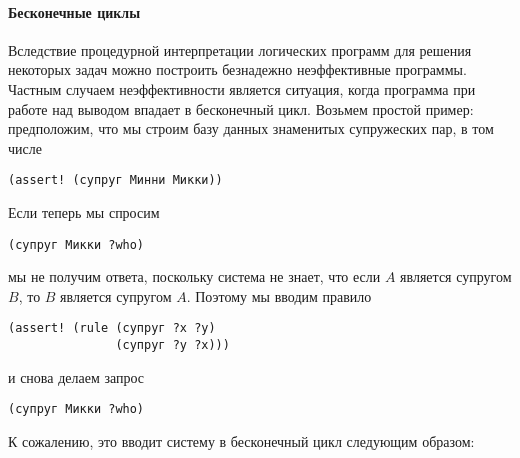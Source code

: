 \paragraph{Бесконечные циклы}

Вследствие 
процедурной интерпретации логических
программ для решения некоторых задач можно построить безнадежно
неэффективные программы.  Частным случаем неэффективности является
ситуация, когда программа при работе над выводом впадает в
бесконечный цикл. Возьмем простой пример: предположим, что мы
строим базу данных знаменитых супружеских пар, в том числе

\begin{Verbatim}[fontsize=\small]
(assert! (супруг Минни Микки))
\end{Verbatim}
Если 
теперь мы спросим

\begin{Verbatim}[fontsize=\small]
(супруг Микки ?who)
\end{Verbatim}
мы не получим ответа, поскольку система не знает, что если
$A$ является супругом $B$, то $B$ является
супругом $A$. Поэтому мы вводим правило

\begin{Verbatim}[fontsize=\small]
(assert! (rule (супруг ?x ?y)
               (супруг ?y ?x)))
\end{Verbatim}
и снова делаем запрос

\begin{Verbatim}[fontsize=\small]
(супруг Микки ?who)
\end{Verbatim}
К сожалению, это вводит систему в бесконечный цикл следующим образом:


